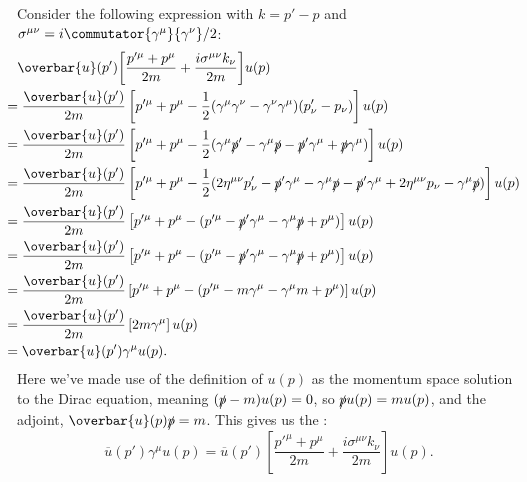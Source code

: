 \documentclass[fleqn]{NotesClass}
\newcommand{\diracadjoint}[1]{\overbar{#1}}
\newcommand{\minkowskiMetric}{\eta}
\begin{document}
    Consider the following expression with \(k = p' - p\) and \(\sigma^{\mu\nu} = i\commutator{\gamma^\mu}{\gamma^\nu}/2\):
    \begingroup
    \allowdisplaybreaks
    \begin{align}
        &\diracadjoint{u}(p')\bigg[ \frac{p'^\mu + p^\mu}{2m} + \frac{i\sigma^{\mu\nu}k_\nu}{2m} \bigg]u(p)\\
        &\hspace{-1em}= \frac{\diracadjoint{u}(p')}{2m}\left[ p'^\mu + p^\mu - \frac{1}{2}(\gamma^\mu \gamma^\nu - \gamma^\nu \gamma^\mu)(p'_\nu - p_\nu) \right] u(p)\\
        &\hspace{-1em}= \frac{\diracadjoint{u}(p')}{2m}\left[ p'^\mu + p^\mu - \frac{1}{2}(\gamma^\mu \slashed{p}' - \gamma^\mu \slashed{p} - \slashed{p}' \gamma^\mu + \slashed{p}\gamma^\mu) \right] u(p)\\
        &\hspace{-1em}= \frac{\diracadjoint{u}(p')}{2m}\left[ p'^\mu + p^\mu - \frac{1}{2}(2\minkowskiMetric^{\mu\nu}p'_\nu - \slashed{p}'\gamma^\mu - \gamma^\mu\slashed{p} - \slashed{p}'\gamma^\mu + 2\minkowskiMetric^{\mu\nu}p_\nu - \gamma^\mu \slashed{p}) \right] u(p) \notag\\
        &\hspace{-1em}= \frac{\diracadjoint{u}(p')}{2m}\left[ p'^\mu + p^\mu - (p'^\mu - \slashed{p}'\gamma^\mu - \gamma^\mu \slashed{p} + p^\mu) \right] u(p)\\
        &\hspace{-1em}= \frac{\diracadjoint{u}(p')}{2m}\left[ p'^\mu + p^\mu - (p'^\mu - \slashed{p}'\gamma^\mu - \gamma^\mu \slashed{p} + p^\mu) \right] u(p)\\
        &\hspace{-1em}= \frac{\diracadjoint{u}(p')}{2m}\left[ p'^\mu + p^\mu - (p'^\mu - m\gamma^\mu - \gamma^\mu m + p^\mu) \right] u(p)\\
        &\hspace{-1em}= \frac{\diracadjoint{u}(p')}{2m}\left[ 2m\gamma^\mu \right] u(p)\\
        &\hspace{-1em}= \diracadjoint{u}(p') \gamma^\mu u(p).
    \end{align}
    \endgroup
    Here we've made use of the definition of \(u(p)\) as the momentum space solution to the Dirac equation, meaning \((\slashed{p} - m)u(p) = 0\), so \(\slashed{p}u(p) = mu(p)\), and the adjoint, \(\diracadjoint{u}(p)\slashed{p} = m\).
    This gives us the :
    \begin{equation}
        \diracadjoint{u}(p')\gamma^\mu u(p) = \diracadjoint{u}(p')\left[ \frac{p'^\mu + p^\mu}{2m} + \frac{i\sigma^{\mu\nu}k_\nu}{2m} \right]u(p).
    \end{equation}
    
\end{document}
